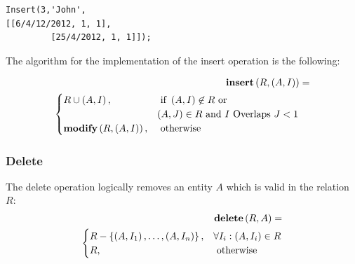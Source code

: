 \begin{enumerate}
\begin{enumerate}
	      \begin{verbatim}
Insert(3,'John',
[[6/4/12/2012, 1, 1],
         [25/4/2012, 1, 1]]);
	    \end{verbatim}
	\end{enumerate}

\end{enumerate}

The algorithm for the implementation of the insert operation is the following:

\begin{align}
\label{eq:insert-fuzzy-temporal}
\mbox{\textbf{insert}} \left(R ,\left(A, I \right) \right) &=\\
\begin{cases}
\nonumber
R \cup \left(A, I \right), & \mbox{ if }  \left(A, I \right) \not \in R \mbox{ or }\\
&  \left(A, J \right) \in R \mbox{ and } I \text{ Overlaps } J < 1\\
\mbox{\textbf{modify}} \left(R, \left(A, I \right)\right), & \mbox{ otherwise }  
\end{cases} 	
\end{align}
\subsubsection{\label{subsubsec:delete-fuzzy-temporal}Delete}
The delete operation logically removes an entity $A$ which is valid in the relation $R$:
\begin{align}
\label{eq:delete-fuzzy-temporal}
\mbox{\textbf{delete}} \left(R ,A \right) =\\
\begin{cases}
\nonumber
R - \left \lbrace \left(A, I_1 \right), \ldots, \left(A, I_n \right) \right \rbrace, &  \forall I_i: \left( A, I_i \right) \in R\\
R, & \mbox{ otherwise }  
\end{cases} 	
\end{align}


